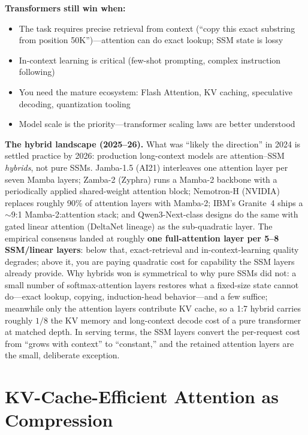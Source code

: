 \textbf{Transformers still win when:}
\begin{itemize}
    \item The task requires precise retrieval from context (``copy this exact substring from position 50K'')---attention can do exact lookup; SSM state is lossy
    \item In-context learning is critical (few-shot prompting, complex instruction following)
    \item You need the mature ecosystem: Flash Attention, KV caching, speculative decoding, quantization tooling
    \item Model scale is the priority---transformer scaling laws are better understood
\end{itemize}

\textbf{The hybrid landscape (2025--26).} What was ``likely the direction'' in 2024 is settled practice by 2026: production long-context models are attention--SSM \textit{hybrids}, not pure SSMs. Jamba-1.5 (AI21) interleaves one attention layer per seven Mamba layers; Zamba-2 (Zyphra) runs a Mamba-2 backbone with a periodically applied shared-weight attention block; Nemotron-H (NVIDIA) replaces roughly 90\% of attention layers with Mamba-2; IBM's Granite~4 ships a $\sim$9:1 Mamba-2:attention stack; and Qwen3-Next-class designs do the same with gated linear attention (DeltaNet lineage) as the sub-quadratic layer. The empirical consensus landed at roughly \textbf{one full-attention layer per 5--8 SSM/linear layers}: below that, exact-retrieval and in-context-learning quality degrades; above it, you are paying quadratic cost for capability the SSM layers already provide. Why hybrids won is symmetrical to why pure SSMs did not: a small number of softmax-attention layers restores what a fixed-size state cannot do---exact lookup, copying, induction-head behavior---and a few suffice; meanwhile only the attention layers contribute KV cache, so a 1:7 hybrid carries roughly $1/8$ the KV memory and long-context decode cost of a pure transformer at matched depth. In serving terms, the SSM layers convert the per-request cost from ``grows with context'' to ``constant,'' and the retained attention layers are the small, deliberate exception.

\section{KV-Cache-Efficient Attention as Compression}
\label{sec:kv_cache_compression}

